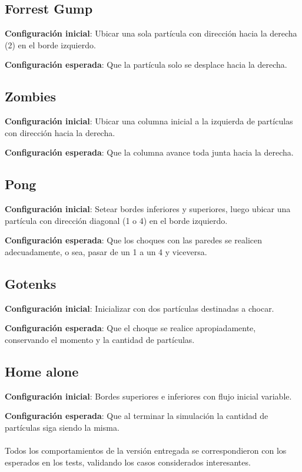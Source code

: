 \documentclass[10pt,a4paper]{article}
\begin{document}
\subsection*{Forrest Gump}
\textbf{Configuración inicial}: Ubicar una sola partícula con dirección hacia la derecha (2) en el borde izquierdo.

\textbf{Configuración esperada}: Que la partícula solo se desplace hacia la derecha.

\subsection*{Zombies}
\textbf{Configuración inicial}: Ubicar una columna inicial a la izquierda de partículas con dirección hacia la derecha. 


\textbf{Configuración esperada}: Que la columna avance toda junta hacia la derecha.

\subsection*{Pong}
\textbf{Configuración inicial}: Setear bordes inferiores y superiores, luego ubicar una partícula con dirección diagonal (1 o 4) en el borde izquierdo.  

\textbf{Configuración esperada}: Que los choques con las paredes se realicen adecuadamente, o sea, pasar de un 1 a un 4 y viceversa.

\subsection*{Gotenks}
\textbf{Configuración inicial}: Inicializar con dos partículas destinadas a chocar.


\textbf{Configuración esperada}: Que el choque se realice apropiadamente, conservando el momento y la cantidad de partículas.

\subsection*{Home alone}
\textbf{Configuración inicial}: Bordes superiores e inferiores con flujo inicial variable.


\textbf{Configuración esperada}: Que al terminar la simulación la cantidad de partículas siga siendo la misma.

\paragraph{}
Todos los comportamientos de la versión entregada se correspondieron con los esperados en los tests, validando los casos considerados interesantes.
\end{document}
